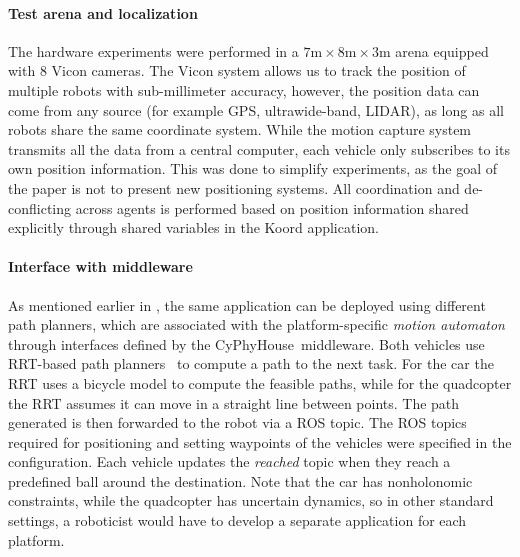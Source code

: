 \paragraph*{Test arena and localization}
The hardware experiments were performed in a $7 \text{m} \times 8 \text{m} \times 3 \text{m}$ arena equipped with 8 Vicon cameras.
The Vicon system allows us to track the position of multiple robots with sub-millimeter accuracy, however, the position data can come from any source (for example GPS, ultrawide-band, LIDAR), as long as all robots share the same coordinate system.
%
%
While the motion capture system transmits all the data from a central computer, each vehicle only subscribes to its own position information.
This was done to simplify experiments, as the goal of the paper is not to present new positioning systems.
%
All coordination and de-conflicting across agents is performed based on position information shared explicitly through shared variables in the Koord application.

\paragraph*{Interface with middleware}

As mentioned earlier in , the same application can be deployed using different path planners, which are associated with the platform-specific \emph{motion automaton} through interfaces defined by the CyPhyHouse\ middleware. Both vehicles use RRT-based path planners~\cite{lavalle1998rapidly} to compute a path to the next task. For the car the RRT uses a bicycle model to compute the feasible paths, while for the quadcopter the RRT assumes it can move in a straight line between points.
%
The path generated is then forwarded to the robot via a ROS topic.
The ROS topics required for positioning and setting waypoints of the vehicles were specified in the configuration.
Each vehicle updates the \emph{reached} topic when they reach a predefined ball around the destination. 
Note that the car has nonholonomic constraints, while the quadcopter has uncertain dynamics, so in other standard settings, a roboticist would have to develop a separate application for each platform. 

